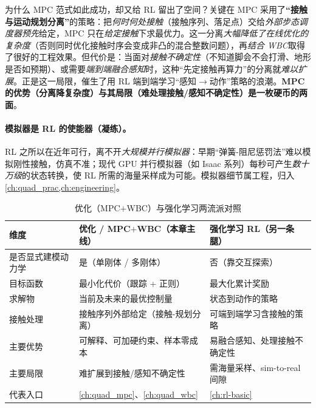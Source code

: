 \begin{insight}\label{ins:qa-contact-split}
为什么 MPC 范式如此成功，却又给 RL 留出了空间？关键在 MPC 采用了\textbf{“接触与运动规划分离”}的策略：把\emph{何时何处接触}（接触序列、落足点）交给\emph{外部步态调度器}\emph{预先}给定，MPC 只在\emph{给定接触}下求最优力。这一分离\emph{大幅降低了在线优化的复杂度}（否则同时优化接触时序会变成非凸的混合整数问题），再\emph{结合 WBC}取得了很好的工程效果\cite{yu2021quadruped}。但代价是：当面对\emph{接触不确定性}（不知道脚会不会打滑、地形是否如预期）、或需要\emph{端到端融合感知}时，这种“先定接触再算力”的分离就\emph{难以扩展}。正是这一局限，催生了用 RL 端到端学习“感知$\to$动作”策略的浪潮。\textbf{MPC 的优势（分离降复杂度）与其局限（难处理接触/感知不确定性）是一枚硬币的两面}。
\end{insight}

\paragraph{模拟器是 RL 的使能器（凝练）。}
RL 之所以在近年可行，离不开\emph{大规模并行模拟器}：早期“弹簧-阻尼惩罚法”难以模拟刚性接触，仿真不准；现代 GPU 并行模拟器（如 Isaac 系列）每秒可产生\emph{数十万级}的状态转换，使 RL 所需的海量采样成为可能\cite{yu2021quadruped}。模拟器细节属工程，归入 \cref{ch:quad_prac,ch:engineering}。

\begin{table}[H]\centering\small
\caption{优化（MPC$+$WBC）与强化学习两流派对照}
\begin{tabular}{p{} p{} p{}}
\toprule
维度 & 优化 / MPC$+$WBC（本章主线） & 强化学习 RL（另一条腿） \\
\midrule
是否显式建模动力学 & 是（单刚体 / 多刚体） & 否（靠交互探索） \\
目标函数 & 最小化代价（跟踪 + 正则） & 最大化累计奖励 \\
求解物 & 当前及未来的最优控制量 & 状态到动作的策略 \\
接触处理 & 接触序列外部给定（接触-规划分离） & 可端到端学习含接触的策略 \\
主要优势 & 可解释、可加硬约束、样本零成本 & 易融合感知、处理接触不确定性 \\
主要局限 & 难扩展到接触/感知不确定性 & 需海量采样、sim-to-real 间隙 \\
代表入口 & \cref{ch:quad_mpc}、\cref{ch:quad_wbc} & \cref{ch:rl-basic} \\
\bottomrule
\end{tabular}
\label{tab:qa-two-streams}
\end{table}

